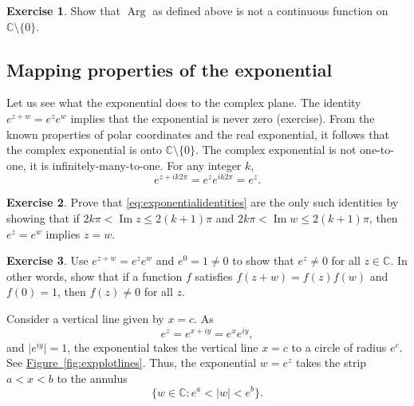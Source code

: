 \documentclass[12pt,openany]{book}
\renewcommand{\Im}{\operatorname{Im}}
\newcommand{\Arg}{\operatorname{Arg}}
\newcommand{\sabs}[1]{\lvert {#1} \rvert}
\newcommand{\C}{{\mathbb{C}}}
\theoremstyle{plain}
\theoremstyle{remark}
\theoremstyle{definition}
\newenvironment{exbox}{%
    \def\FrameCommand{\vrule width 1pt \relax\hspace{10pt}}%
    \MakeFramed{\advance\hsize-\width\FrameRestore}%
}{%
    \endMakeFramed
}
\theoremstyle{exercise}
\newtheorem{exercise}{Exercise}[section]
\theoremstyle{example}
\newcommand{\figureref}[1]{\hyperref[#1]{Figure~\ref*{#1}}}
\begin{document}
\begin{exbox}
\begin{exercise}
Show that $\Arg$ as defined above is not a continuous function on 
$\C \setminus \{ 0 \}$.
\end{exercise}
\end{exbox}

\subsection{Mapping properties of the exponential}

Let us see what the exponential does to the complex plane.
The identity $e^{z+w} = e^z e^w$ implies that the exponential
is never zero (exercise).
From the known properties of polar coordinates
and the real exponential, it follows that the complex exponential is
onto $\C \setminus \{ 0 \}$.
The complex exponential is not one-to-one, it is 
infinitely-many-to-one.  For any integer $k$,
\begin{equation} \label{eq:exponentialidentities}
e^{z+ik2\pi} = 
e^{z} e^{ik2\pi} =
e^z .
\end{equation}

\begin{exbox}
\begin{exercise} \label{exercise:exponetoonestrip}
Prove that \eqref{eq:exponentialidentities} are the only such identities by
showing that if $2k\pi < \Im z \leq 2(k+1)\pi$ and
$2k\pi < \Im w \leq 2(k+1)\pi$, then $e^z=e^w$ implies $z=w$.
\end{exercise}

\begin{exercise}%
Use $e^{z+w} = e^z e^w$ and $e^0 = 1 \not= 0$ to show that $e^z \not=0$ for all
$z \in \C$.  In other words, show that if a function $f$ satisfies $f(z+w)=f(z)f(w)$
and $f(0) = 1$, then $f(z) \not= 0$ for all $z$.
\end{exercise}
\end{exbox}

Consider a vertical line given by $x=c$.  As
\begin{equation*}
e^{z} = 
e^{x+iy} =
e^x e^{iy} ,
\end{equation*}
and $\sabs{e^{iy}} =1$, the exponential takes the vertical line $x=c$ to a
circle of radius $e^c$.  See \figureref{fig:expplotlines}.
Thus, the exponential $w=e^z$ takes the strip $a < x < b$ to the
annulus
\begin{equation*}
\bigl\{ w \in \C : e^a < \sabs{w} < e^b \bigr\} .
\end{equation*}
\end{document}

